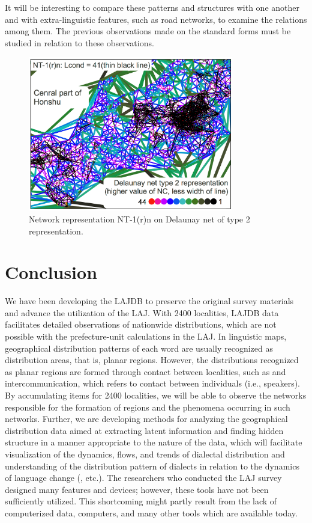 \documentclass[output=paper]{LSP/langsci}
\begin{document}
It will be interesting to compare these patterns and structures with one another and with extra-linguistic features, such as road networks, to examine the relations among them. The previous observations made on the standard forms must be studied in relation to these observations.

\begin{figure}
\includegraphics[width=0.8\textwidth]{illustrations/kuma_fig25}
\caption{Network representation NT-1(r)n on Delaunay net of type 2 representation.}
\label{fig:kuma:25}
\end{figure}  


\section{Conclusion}
We have been developing the LAJDB to preserve the original survey materials and advance the utilization of the LAJ. With 2400 localities, LAJDB data facilitates detailed observations of nationwide distributions, which are not possible with the prefecture-unit calculations in the LAJ. In linguistic maps, geographical distribution patterns of each word are usually recognized as distribution areas, that is, planar regions. However, the distributions recognized as planar regions are formed through contact between localities, such as  and intercommunication, which refers to contact between individuals (i.e., speakers). By accumulating items for 2400 localities, we will be able to observe the networks responsible for the formation of regions and the phenomena occurring in such networks. Further, we are developing methods for analyzing the geographical distribution data aimed at extracting latent information and finding hidden structure in a manner appropriate to the nature of the data, which will facilitate visualization of the dynamics, flows, and trends of dialectal distribution and understanding of the distribution pattern of dialects in relation to the dynamics of language change (\citealt{sibata_s&k_1993,kumagai_nihon_2013,kumagai_development_2013}, etc.). The researchers who conducted the LAJ survey designed many features and devices; however, these tools have not been sufficiently utilized. This shortcoming might partly result from the lack of computerized data, computers, and many other tools which are available today. 
\end{document}
